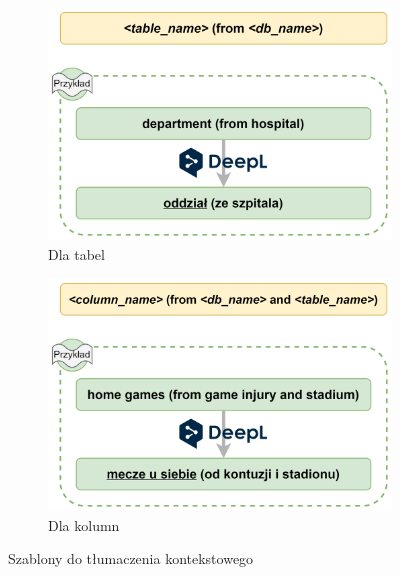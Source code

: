 \begin{figure}[ht!]
\centering
\begin{subfigure}{0.49\textwidth}
    \includegraphics[width=\textwidth]{images/translation_in_context_table.png}
    \caption{Dla tabel}
    \label{fig:first}
\end{subfigure}
\hfill
\begin{subfigure}{0.49\textwidth}
    \includegraphics[width=\textwidth]{images/translation_in_context_column.png}
    \caption{Dla kolumn}
    \label{fig:second}
\end{subfigure}
\caption{Szablony do tłumaczenia kontekstowego}
\label{fig:translation-in-context}
\end{figure}

